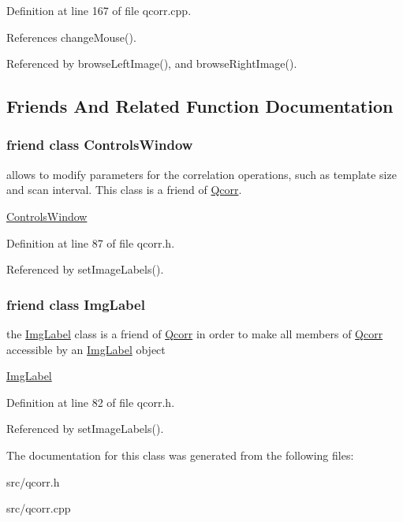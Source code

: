 Definition at line 167 of file qcorr.cpp.

References changeMouse().

Referenced by browseLeftImage(), and browseRightImage().

\subsection{Friends And Related Function Documentation}
\hypertarget{classQcorr_ce49e9a34b2d2df1e7683be4cacba1d8}{
\subsubsection[{ControlsWindow}]{\setlength{\rightskip}{0pt plus 5cm}friend class {\bf ControlsWindow}}}
\label{classQcorr_ce49e9a34b2d2df1e7683be4cacba1d8}


allows to modify parameters for the correlation operations, such as template size and scan interval. This class is a friend of \hyperlink{classQcorr}{Qcorr}. 

\hyperlink{classControlsWindow}{ControlsWindow} 

Definition at line 87 of file qcorr.h.

Referenced by setImageLabels().\hypertarget{classQcorr_5b4b2caf4c596b601dd096785e4a32b9}{
\subsubsection[{ImgLabel}]{\setlength{\rightskip}{0pt plus 5cm}friend class {\bf ImgLabel}}}
\label{classQcorr_5b4b2caf4c596b601dd096785e4a32b9}


the \hyperlink{classImgLabel}{ImgLabel} class is a friend of \hyperlink{classQcorr}{Qcorr} in order to make all members of \hyperlink{classQcorr}{Qcorr} accessible by an \hyperlink{classImgLabel}{ImgLabel} object 

\hyperlink{classImgLabel}{ImgLabel} 

Definition at line 82 of file qcorr.h.

Referenced by setImageLabels().

The documentation for this class was generated from the following files:\begin{CompactItemize}
\item 
src/qcorr.h\item 
src/qcorr.cpp\end{CompactItemize}
